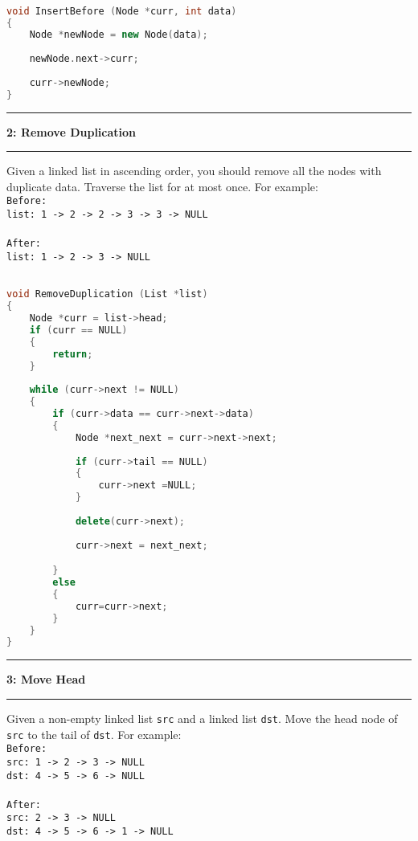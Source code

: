 \documentclass[10.5pt]{article}
\newcommand\question[2]{\vspace{.25in}\hrule\textbf{#1: #2}\vspace{.5em}\hrule\vspace{.10in}}
\begin{document}
\hrulefill
\begin{lstlisting}[language=C++]

void InsertBefore (Node *curr, int data)
{
    Node *newNode = new Node(data);
    
    newNode.next->curr;
    
    curr->newNode;
}

\end{lstlisting}

\pagebreak

\question{2}{Remove Duplication}
Given a linked list in ascending order, you should remove all the nodes with duplicate data. Traverse the list for at most once. For example: \\

\texttt{Before:}\\
\texttt{list: 1 -> 2 -> 2 -> 3 -> 3 -> NULL}\\
\\
\texttt{After:}\\
\texttt{list: 1 -> 2 -> 3 -> NULL}\\


\hrulefill
\begin{lstlisting}[language=C++]

void RemoveDuplication (List *list)
{
    Node *curr = list->head;
    if (curr == NULL) 
    {
        return;
    }
	
    while (curr->next != NULL)
    {
        if (curr->data == curr->next->data)
        {
            Node *next_next = curr->next->next;
                        
            if (curr->tail == NULL)
            {
                curr->next =NULL;
            }
            
            delete(curr->next);
            
            curr->next = next_next;

        }
        else
        {
            curr=curr->next;
        }
    }
}
\end{lstlisting}
\pagebreak


\question{3}{Move Head}
Given a non-empty linked list \texttt{src} and a linked list \texttt{dst}. Move the head node of \texttt{src} to the tail of \texttt{dst}. For example: \\

\texttt{Before:}\\
\texttt{src: 1 -> 2 -> 3 -> NULL}\\
\texttt{dst: 4 -> 5 -> 6 -> NULL}\\
\\
\texttt{After:}\\
\texttt{src: 2 -> 3 -> NULL}\\
\texttt{dst: 4 -> 5 -> 6 -> 1 -> NULL}\\
\end{document}
